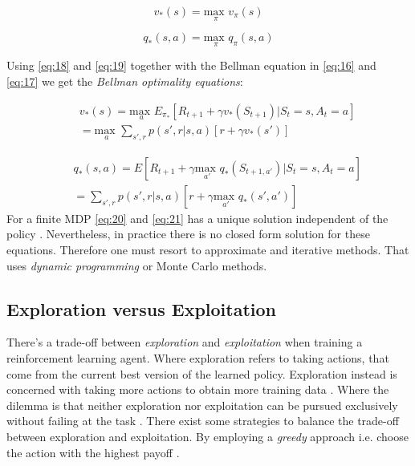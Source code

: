 \documentclass{kththesis}
\theoremstyle{definition}
\begin{document}
\begin{equation}
    \label{eq:18}
    v_{*}(s) = \underset{\pi}{\text{max }} v_{\pi}(s)
\end{equation}

\begin{equation}
    \label{eq:19}
    q_{*}(s,a) = \underset{\pi}{\text{max }} q_{\pi}(s,a)
\end{equation}

Using \autoref{eq:18} and \autoref{eq:19} together with the Bellman equation in \autoref{eq:16} and \autoref{eq:17} we get the \textit{Bellman optimality equations}:

\begin{equation}
\label{eq:20}
\begin{aligned}
& & v_{*}(s) =  \underset{a}{\text{max }} 
E_{\pi_{*}}[R_{t+1} + \gamma v_{*}(S_{t+1}) | S_t =s, A_t = a] \\
& & = \underset{a}{\text{max }} 
\sum_{s', r}^{}{p(s', r | s,a)}[r + \gamma v_{*}(s')]
\end{aligned}
\end{equation}

\begin{equation}
\label{eq:21}
\begin{aligned}
& & q_{*}(s,a) = 
E[R_{t+1} + \gamma \underset{a'}{\text{max }}q_{*}(S_{t+1, a'}) | S_t =s, A_t = a] \\
& & =  \sum_{s', r}^{}{p(s', r | s,a)}[r + \gamma \underset{a'}{\text{max }}q_{*}(s',a')]
\end{aligned}
\end{equation}
For a finite MDP \autoref{eq:20} and \autoref{eq:21} has a unique solution independent of the policy \parencite{sutton1998reinforcement}. Nevertheless, in practice there is no closed form solution for these equations. Therefore one must resort to approximate and iterative methods. That uses \textit{dynamic programming} or Monte Carlo methods.

\subsection{Exploration versus Exploitation}
There's a trade-off between \textit{exploration} and \textit{exploitation} when training a reinforcement learning agent. Where exploration refers to taking actions, that come from the current best version of the learned policy. Exploration instead is concerned with taking more actions to obtain more training data \parencite{goodfellow2016deep}. Where the dilemma is that neither exploration nor exploitation can be pursued exclusively without failing at the task \parencite{sutton1998reinforcement}. There exist some strategies to balance the trade-off between exploration and exploitation. By employing a \textit{greedy} approach i.e. choose the action with the highest payoff \parencite{sutton1998reinforcement, szepesvari2009algorithms}.
\end{document}

